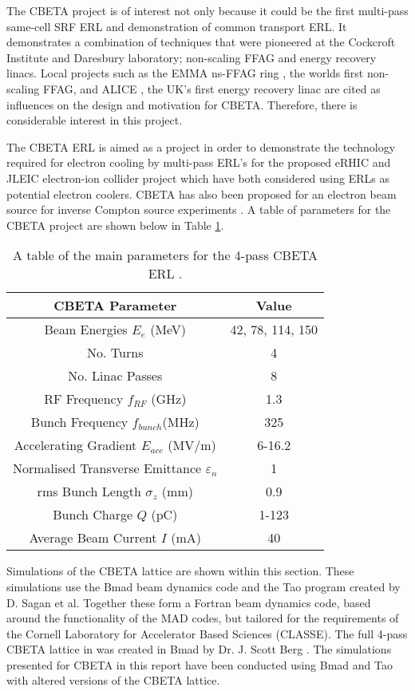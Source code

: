 \documentclass[11pt]{article}
\begin{document}
The CBETA project is of interest not only because it could be the first multi-pass same-cell SRF ERL and demonstration of common transport ERL. It demonstrates a combination of techniques that were pioneered at the Cockcroft Institute and Daresbury laboratory; non-scaling FFAG and energy recovery linacs. Local projects such as the EMMA ns-FFAG ring \cite{EMMApac}, the worlds first non-scaling FFAG, and ALICE \cite{ALICE2012IPAC}, the UK's first energy recovery linac are cited as influences on the design and motivation for CBETA. Therefore, there is considerable interest in this project.

The CBETA ERL is aimed as a project in order to demonstrate the technology required for electron cooling by multi-pass ERL's for the proposed eRHIC \cite{eRHIC} and JLEIC \cite{JLEIC} electron-ion collider project which have both considered using ERLs as potential electron coolers. CBETA has also been proposed for an electron beam source for inverse Compton source experiments \cite{KirstenIPAC}. A table of parameters for the CBETA project are shown below in Table \ref{tab:CBETAparam}.

\begin{table}[H]
\centering
\begin{tabular}{|c||c|}
\hline
\textbf{CBETA Parameter} & \textbf{Value} \\
\hline
Beam Energies $E_{e}$ (MeV) & 42, 78, 114, 150 \\
\hline
No. Turns & 4 \\
\hline
No. Linac Passes & 8 \\
\hline
RF Frequency $f_{RF}$ (GHz) & 1.3 \\
\hline
Bunch Frequency $f_{bunch}$(MHz) & 325 \\
\hline
Accelerating Gradient $E_{acc}$ (MV/m) & 6-16.2 \\
\hline
Normalised Transverse Emittance $\varepsilon_{n}$ & 1 \\
\hline
rms Bunch Length $\sigma_{z}$ (mm) & 0.9 \\
\hline
Bunch Charge $Q$ (pC) & 1-123 \\
\hline
Average Beam Current $I$ (mA) & 40 \\
\hline
\end{tabular}
\caption{\label{tab:CBETAparam} A table of the main parameters for the 4-pass CBETA ERL \cite{CBETATDR}.}
\end{table}

Simulations of the CBETA lattice are shown within this section. These simulations use the Bmad \cite{Bmad} beam dynamics code and the Tao \cite{Tao} program created by D. Sagan et al. Together these form a Fortran beam dynamics code, based around the functionality of the MAD codes, but tailored for the requirements of the Cornell Laboratory for Accelerator Based Sciences (CLASSE). The full 4-pass CBETA lattice in was created in Bmad by Dr. J. Scott Berg \cite{BmadLattice}. The simulations presented for CBETA in this report have been conducted using Bmad and Tao with altered versions of the CBETA lattice.
  
\end{document}
